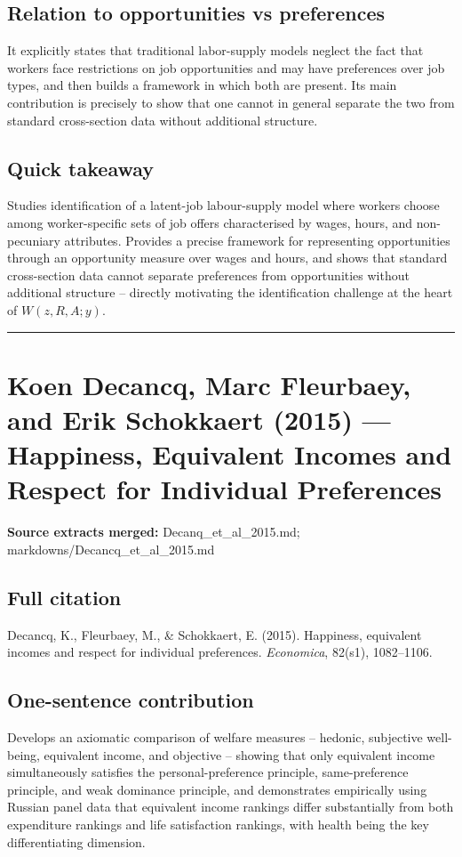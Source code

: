 \documentclass[11pt,a4paper]{article}
\begin{document}
\subsection*{Relation to opportunities vs preferences}
It explicitly states that traditional labor-supply models neglect the fact that workers face restrictions on job opportunities and may have preferences over job types, and then builds a framework in which both are present. Its main contribution is precisely to show that one cannot in general separate the two from standard cross-section data without additional structure.

\subsection*{Quick takeaway}
Studies identification of a latent-job labour-supply model where workers choose among worker-specific sets of job offers characterised by wages, hours, and non-pecuniary attributes. Provides a precise framework for representing opportunities through an opportunity measure over wages and hours, and shows that standard cross-section data cannot separate preferences from opportunities without additional structure -- directly motivating the identification challenge at the heart of $W(z,R,A;y)$.


\medskip\hrule\medskip

\section*{Koen Decancq, Marc Fleurbaey, and Erik Schokkaert (2015) — Happiness, Equivalent Incomes and Respect for Individual Preferences}

\textbf{Source extracts merged:} Decanq\_et\_al\_2015.md; markdowns/Decancq\_et\_al\_2015.md

\subsection*{Full citation}
Decancq, K., Fleurbaey, M., \& Schokkaert, E. (2015). Happiness, equivalent incomes and respect for individual preferences. \textit{Economica}, 82(s1), 1082--1106.

\subsection*{One-sentence contribution}
Develops an axiomatic comparison of welfare measures -- hedonic, subjective well-being, equivalent income, and objective -- showing that only equivalent income simultaneously satisfies the personal-preference principle, same-preference principle, and weak dominance principle, and demonstrates empirically using Russian panel data that equivalent income rankings differ substantially from both expenditure rankings and life satisfaction rankings, with health being the key differentiating dimension.
\end{document}
